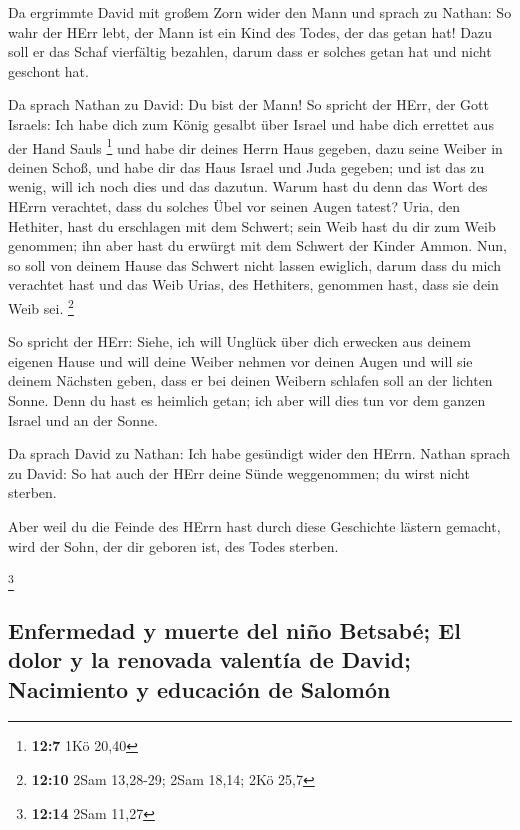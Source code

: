  Da ergrimmte David mit großem Zorn wider den Mann und
sprach zu Nathan: So wahr der HErr lebt, der Mann ist ein Kind des
Todes, der das getan hat!  Dazu soll er das Schaf
vierfältig bezahlen, darum dass er solches getan hat und nicht geschont
hat.

 Da sprach Nathan zu David: Du bist der Mann! So spricht
der HErr, der Gott Israels: Ich habe dich zum König gesalbt über Israel
und habe dich errettet aus der Hand Sauls \footnote{\textbf{12:7} 1Kö
  20,40}  und habe dir deines Herrn Haus gegeben, dazu
seine Weiber in deinen Schoß, und habe dir das Haus Israel und Juda
gegeben; und ist das zu wenig, will ich noch dies und das dazutun.
 Warum hast du denn das Wort des HErrn verachtet, dass du
solches Übel vor seinen Augen tatest? Uria, den Hethiter, hast du
erschlagen mit dem Schwert; sein Weib hast du dir zum Weib genommen; ihn
aber hast du erwürgt mit dem Schwert der Kinder Ammon. 
Nun, so soll von deinem Hause das Schwert nicht lassen ewiglich, darum
dass du mich verachtet hast und das Weib Urias, des Hethiters, genommen
hast, dass sie dein Weib sei. \footnote{\textbf{12:10} 2Sam 13,28-29;
  2Sam 18,14; 2Kö 25,7}

 So spricht der HErr: Siehe, ich will Unglück über dich
erwecken aus deinem eigenen Hause und will deine Weiber nehmen vor
deinen Augen und will sie deinem Nächsten geben, dass er bei deinen
Weibern schlafen soll an der lichten Sonne.  Denn du hast
es heimlich getan; ich aber will dies tun vor dem ganzen Israel und an
der Sonne.

 Da sprach David zu Nathan: Ich habe gesündigt wider den
HErrn. Nathan sprach zu David: So hat auch der HErr deine Sünde
weggenommen; du wirst nicht sterben.

 Aber weil du die Feinde des HErrn hast durch diese
Geschichte lästern gemacht, wird der Sohn, der dir geboren ist, des
Todes sterben.

\footnote{\textbf{12:14} 2Sam 11,27}

\hypertarget{enfermedad-y-muerte-del-niuxf1o-betsabuxe9-el-dolor-y-la-renovada-valentuxeda-de-david-nacimiento-y-educaciuxf3n-de-salomuxf3n}{%
\subsection{Enfermedad y muerte del niño Betsabé; El dolor y la renovada
valentía de David; Nacimiento y educación de
Salomón}\label{enfermedad-y-muerte-del-niuxf1o-betsabuxe9-el-dolor-y-la-renovada-valentuxeda-de-david-nacimiento-y-educaciuxf3n-de-salomuxf3n}}

